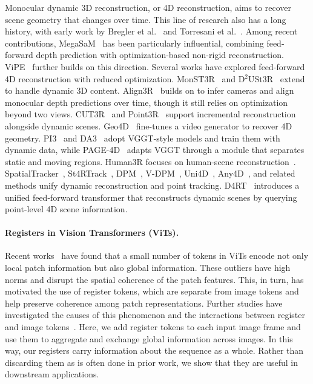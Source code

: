 Monocular dynamic 3D reconstruction, or 4D reconstruction, aims to recover scene geometry that changes over time.
This line of research also has a long history, with early work by Bregler et al.~\cite{bregler00recovering} and Torresani et al.~\cite{torresani08nonrigid}.
Among recent contributions, MegaSaM~\cite{li25megasam:} has been particularly influential, combining feed-forward depth prediction with optimization-based non-rigid reconstruction.
ViPE~\cite{huang25vipe:} further builds on this direction.
Several works have explored feed-forward 4D reconstruction with reduced optimization.
MonST3R~\cite{zhang24monst3r:} and D$^2$USt3R~\cite{han25d2ust3r:} extend \duster to handle dynamic 3D content.
Align3R~\cite{lu25align3r:} builds on \duster to infer cameras and align monocular depth predictions over time, though it still relies on optimization beyond two views.
CUT3R~\cite{wang25continuous} and Point3R~\cite{wu25point3r:} support incremental reconstruction alongside dynamic scenes.
Geo4D~\cite{jiang25geo4d} fine-tunes a video generator to recover 4D geometry.
PI3~\cite{wang25p3} and DA3~\cite{lin25depth} adopt VGGT-style models and train them with dynamic data, while PAGE-4D~\cite{zhou25page-4d:} adapts VGGT through a module that separates static and moving regions.
Human3R focuses on human-scene reconstruction~\cite{chen25human3r:}.
SpatialTracker~\cite{xiao25spatialtrackerv2:}, St4RTrack~\cite{feng25st4rtrack:}, DPM~\cite{sucar25dynamic}, V-DPM~\cite{sucar26v-dpm}, Uni4D~\cite{yao25uni4d:}, Any4D~\cite{karhade2025any4d}, and related methods unify dynamic reconstruction and point tracking.
D4RT~\cite{zhang25efficiently} introduces a unified feed-forward transformer that reconstructs dynamic scenes by querying point-level 4D scene information.


\paragraph{Registers in Vision Transformers (ViTs).}

Recent works~\cite{darcet24vision, marouani26revisiting} have found that a small number of tokens in ViTs encode not only local patch information but also global information.
These outliers have high norms and disrupt the spatial coherence of the patch features.
This, in turn, has motivated the use of register tokens, which are separate from image tokens and help preserve coherence among patch representations. 
Further studies have investigated the causes of this phenomenon and the interactions between register and image tokens~\cite{jiang25vision, shi26vision, lappe25register, marouani26revisiting}.
Here, we add register tokens to each input image frame and use them to aggregate and exchange global information across images.
In this way, our registers carry information about the sequence as a whole.
Rather than discarding them as is often done in prior work, we show that they are useful in downstream applications.
